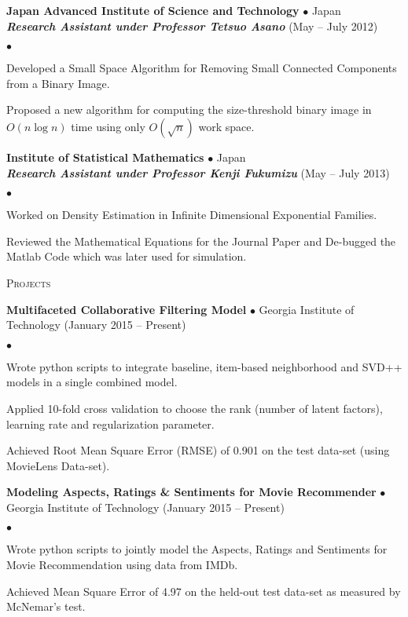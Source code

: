 \documentclass[10pt]{article}
\newcommand{\lineunder}{\\\vspace{-9pt}\hrulefill}
\newcommand{\header}[1]{{\normalsize\scshape{#1}} \lineunder}
\newcommand{\project}[3]{{ \textbf{#1} $\bullet$ #2 \hfill (#3)\\  }}
\newenvironment{achievements}{\begin{list}{$\bullet$}{\topsep 0pt \itemsep 0pt}}{\end{list}}
\newcommand{\employer}[4]{ \textbf{#1} $\bullet$ #2 \\ \textbf{\emph{#4}} \hfill (#3)\\  }
\begin{document}
\employer{Japan Advanced Institute of Science and Technology}{Japan}{May -- July 2012}{Research Assistant under Professor Tetsuo Asano}
	\begin{achievements}	
	\item Developed a Small Space Algorithm for Removing Small Connected Components from a Binary Image.
	\item Proposed a new algorithm for computing the size-threshold binary image in $O(n \log n)$ time using only $O(\sqrt{n})$ work space.
	\end{achievements}

\employer{Institute of Statistical Mathematics}{Japan}{May -- July 2013}{Research Assistant under Professor Kenji Fukumizu}
	\begin{achievements}
	\item Worked on Density Estimation in Infinite Dimensional Exponential Families.
	\item Reviewed the Mathematical Equations for the Journal Paper and De-bugged the Matlab Code which was later used for simulation.
	\end{achievements}
	
\vspace{3pt}

\header{Projects}

\project{Multifaceted Collaborative Filtering Model}{Georgia Institute of Technology}{January 2015 -- Present}
	\begin{achievements}
	\item Wrote python scripts to integrate baseline, item-based neighborhood and SVD++ models in a single combined model.
	\item Applied 10-fold cross validation to choose the rank (number of latent factors), learning rate and regularization parameter.
	\item Achieved Root Mean Square Error (RMSE) of 0.901 on the test data-set (using MovieLens Data-set).
	\end{achievements}	
	
\project{Modeling Aspects, Ratings \& Sentiments for Movie Recommender}{Georgia Institute of Technology}{January 2015 -- Present}
\begin{achievements}
	\item Wrote python scripts to jointly model the Aspects, Ratings and Sentiments for Movie Recommendation using data from IMDb.
	\item Achieved Mean Square Error of 4.97 on the held-out test data-set as measured by McNemar's test.
	\end{achievements}	
	
\end{document}
